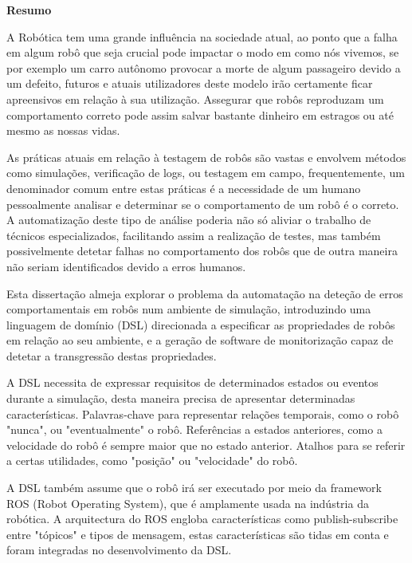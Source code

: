 
\vspace*{2cm}
\begin{center} \Large \bf Resumo
\end{center}
\vspace*{1cm} \setlength{\baselineskip}{0.6cm}

A Robótica tem uma grande influência na sociedade atual, ao ponto que a falha em algum robô que seja crucial pode impactar o modo em como nós vivemos, se por exemplo um carro autônomo provocar a morte de algum passageiro devido a um defeito, futuros e atuais utilizadores deste modelo irão certamente ficar apreensivos em relação à sua utilização. Assegurar que robôs reproduzam um comportamento correto pode assim salvar bastante dinheiro em estragos ou até mesmo as nossas vidas.

As práticas atuais em relação à testagem de robôs são vastas e envolvem métodos como simulações, verificação de logs, ou testagem em campo, frequentemente, um denominador comum entre estas práticas é a necessidade de um humano pessoalmente analisar e determinar se o comportamento de um robô é o correto. A automatização deste tipo de análise poderia não só aliviar o trabalho de técnicos especializados, facilitando assim a realização de testes, mas também possivelmente detetar falhas no comportamento dos robôs que de outra maneira não seriam identificados devido a erros humanos.

Esta dissertação almeja explorar o problema da automatação na deteção de erros comportamentais em robôs num ambiente de simulação, introduzindo uma linguagem de domínio (DSL) direcionada a especificar as propriedades de robôs em relação ao seu ambiente, e a geração de software de monitorização capaz de detetar a transgressão destas propriedades.

A DSL necessita de expressar requisitos de determinados estados ou eventos durante a simulação, desta maneira precisa de apresentar determinadas características. Palavras-chave para representar relações temporais, como o robô "nunca", ou "eventualmente" o robô. Referências a estados anteriores, como a velocidade do robô é sempre maior que no estado anterior. Atalhos para se referir a certas utilidades, como "posição" ou "velocidade" do robô.

A DSL também assume que o robô irá ser executado por meio da framework ROS (Robot Operating System), que é amplamente usada na indústria da robótica. A arquitectura do ROS engloba características como publish-subscribe entre "tópicos" e tipos de mensagem, estas características são tidas em conta e foram integradas no desenvolvimento da DSL.

